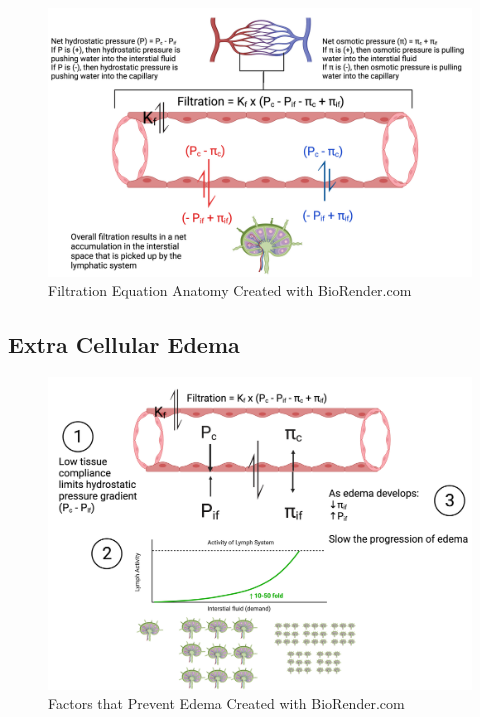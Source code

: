 \subsection{}
\begin{figure}[!h]
    \centering
    \includegraphics[width=1\linewidth]{./figure/Microcirculation_Regulation.png}
    \caption{Filtration Equation Anatomy \footnotesize{Created with BioRender.com}}
    \label{fig:Microcirculation_Regulation}
\end{figure}

\subsection{Extra Cellular Edema}

\begin{figure}[!h]
    \centering
    \includegraphics[width=1\linewidth]{./figure/Factors_Prevent_Edema.png}
    \caption{Factors that Prevent Edema \footnotesize{Created with BioRender.com}}
    \label{fig:Factors_Prevent_Edema}
\end{figure}


